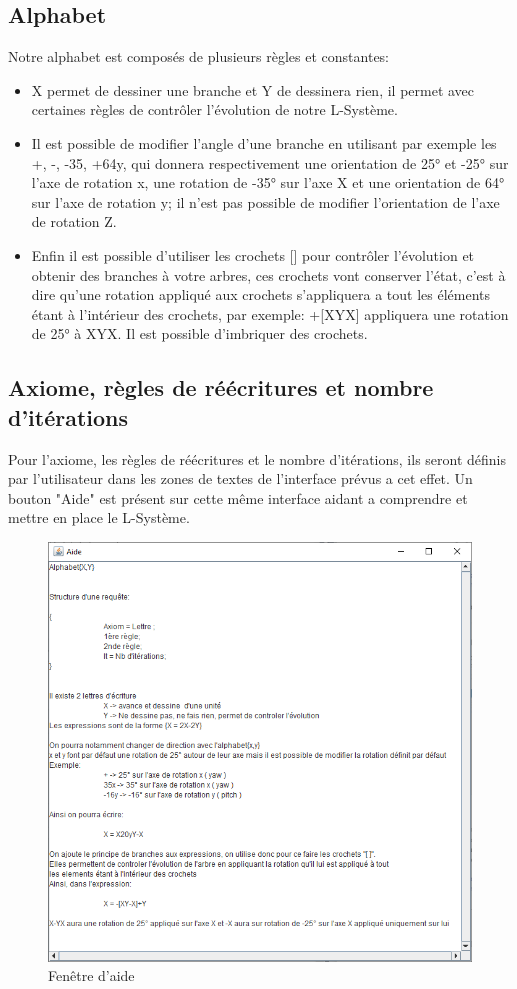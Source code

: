 \subsection{Alphabet}
Notre alphabet est composés de plusieurs règles et constantes:\\
\begin{itemize}
    \item X permet de dessiner une branche et Y de dessinera rien, il permet avec certaines règles de contrôler l'évolution de notre L-Système.
    \item Il est possible de modifier l'angle d'une branche en utilisant par exemple les +, -, -35, +64y, qui donnera 
respectivement une orientation de 25° et -25° sur l'axe de rotation x, une rotation de -35° sur l'axe X et une orientation de 64° sur l'axe de rotation y; il n'est pas possible de modifier l'orientation de l'axe de rotation Z.
\item Enfin il est possible d'utiliser les crochets [] pour contrôler l'évolution et obtenir des branches à votre arbres, ces crochets vont conserver l'état, c'est à dire qu'une rotation appliqué aux crochets s'appliquera a tout les éléments étant à l'intérieur des crochets, par exemple: +[XYX] appliquera une rotation de 25° à XYX. Il est possible d'imbriquer des crochets.
\end{itemize}

\subsection{Axiome, règles de réécritures et nombre d'itérations}
Pour l'axiome, les règles de réécritures et le nombre d'itérations, ils seront définis par l'utilisateur dans les zones de textes de l'interface prévus a cet effet. 
Un bouton "Aide" est présent sur cette même interface aidant a comprendre et mettre en place le L-Système.

\begin{figure}[h!]
    \centering
    \includegraphics[width=0.8\linewidth]{pics/aideGUI.png}
    \caption{Fenêtre d'aide}
    \label{fig:my_label}
\end{figure}
